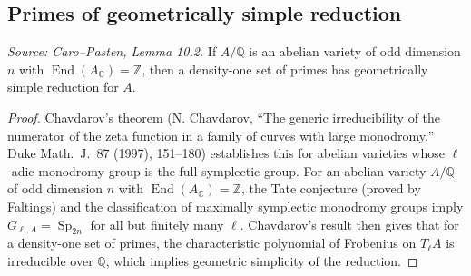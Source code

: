 \subsection{Primes of geometrically simple reduction}

\begin{lemma}
  \label{lem:cp_chavdarov_simple_reduction}
  \textit{Source: Caro--Pasten, Lemma 10.2.}
  If \(A/\mathbb Q\) is an abelian variety of odd dimension \(n\) with
  \(\operatorname{End}(A_\mathbb C)=\mathbb Z\), then a density-one set of
  primes has geometrically simple reduction for \(A\).
\end{lemma}
\begin{proof}
  Chavdarov's theorem (N. Chavdarov, ``The generic irreducibility of the numerator
  of the zeta function in a family of curves with large monodromy,'' Duke Math.\ J.\
  87 (1997), 151--180) establishes this for abelian varieties whose
  \(\ell\)-adic monodromy group is the full symplectic group.  For an abelian
  variety \(A/\mathbb Q\) of odd dimension \(n\) with
  \(\operatorname{End}(A_\mathbb C)=\mathbb Z\), the Tate conjecture (proved by
  Faltings) and the classification of maximally symplectic monodromy groups
  imply \(G_{\ell,A}=\operatorname{Sp}_{2n}\) for all but finitely many \(\ell\).
  Chavdarov's result then gives that for a density-one set of primes, the
  characteristic polynomial of Frobenius on \(T_\ell A\) is irreducible over
  \(\mathbb Q\), which implies geometric simplicity of the reduction.
\end{proof}

